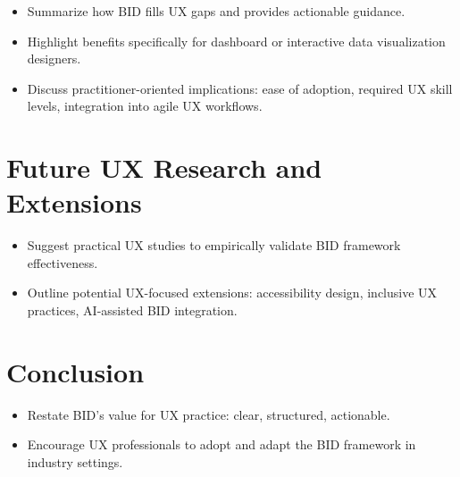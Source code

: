 \documentclass[
  authoryear,
  preprint]{elsarticle}
\providecommand{\tightlist}{%
  \setlength{\itemsep}{0pt}\setlength{\parskip}{0pt}}\usepackage{longtable,booktabs,array}
\begin{document}
\begin{itemize}
\tightlist
\item
  Summarize how BID fills UX gaps and provides actionable guidance.
\item
  Highlight benefits specifically for dashboard or interactive data
  visualization designers.
\item
  Discuss practitioner-oriented implications: ease of adoption, required
  UX skill levels, integration into agile UX workflows.
\end{itemize}

\section{Future UX Research and
Extensions}\label{future-ux-research-and-extensions}

\begin{itemize}
\tightlist
\item
  Suggest practical UX studies to empirically validate BID framework
  effectiveness.
\item
  Outline potential UX-focused extensions: accessibility design,
  inclusive UX practices, AI-assisted BID integration.
\end{itemize}

\section{Conclusion}\label{conclusion}

\begin{itemize}
\tightlist
\item
  Restate BID's value for UX practice: clear, structured, actionable.
\item
  Encourage UX professionals to adopt and adapt the BID framework in
  industry settings.
\end{itemize}


  
\end{document}
